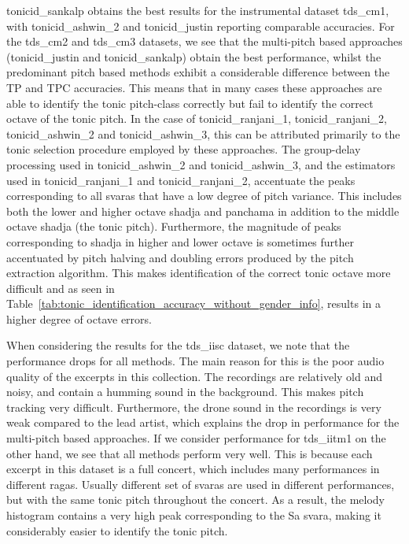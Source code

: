 {\acrshort{tonicid_sankalp} obtains the best results for the instrumental dataset \acrshort{tds_cm1}, with \acrshort{tonicid_ashwin_2} and \acrshort{tonicid_justin} reporting comparable accuracies. For the \acrshort{tds_cm2} and \acrshort{tds_cm3} datasets, we see that the multi-pitch based approaches (\acrshort{tonicid_justin} and \acrshort{tonicid_sankalp}) obtain the best performance, whilst the predominant pitch based methods exhibit a considerable difference between the TP and TPC accuracies. This means that in many cases these approaches are able to identify the tonic pitch-class correctly but fail to identify the correct octave of the tonic pitch. In the case of \acrshort{tonicid_ranjani_1}, \acrshort{tonicid_ranjani_2}, \acrshort{tonicid_ashwin_2} and \acrshort{tonicid_ashwin_3}, this can be attributed primarily to the tonic selection procedure employed by these approaches. The group-delay processing used in \acrshort{tonicid_ashwin_2} and \acrshort{tonicid_ashwin_3}, and the estimators used in \acrshort{tonicid_ranjani_1} and \acrshort{tonicid_ranjani_2}, accentuate the peaks corresponding to all \glspl{svara} that have a low degree of pitch variance. This includes both the lower and higher octave \gls{shadja} and panchama in addition to the middle octave \gls{shadja} (the tonic pitch). Furthermore, the magnitude of peaks corresponding to \gls{shadja} in higher and lower octave is sometimes further accentuated by pitch halving and doubling errors produced by the pitch extraction algorithm. This makes identification of the correct tonic octave more difficult and as seen in Table~\ref{tab:tonic_identification_accuracy_without_gender_info}, results in a higher degree of octave errors.

When considering the results for the \acrshort{tds_iisc} dataset, we note that the performance drops for all methods. The main reason for this is the poor audio quality of the excerpts in this collection. The recordings are relatively old and noisy, and contain a humming sound in the background. This makes pitch
tracking very difficult. Furthermore, the drone sound in the recordings is very weak compared to the lead artist, which explains the drop in performance for the multi-pitch based approaches. If we consider performance for \acrshort{tds_iitm1} on the other hand, we see that all methods perform very well. This is because each excerpt in this dataset is a full concert, which includes many performances in different \glspl{raga}. Usually different set of \glspl{svara} are used in different performances, but with the same tonic pitch throughout the concert. As a result, the melody histogram contains a very high peak corresponding to the Sa \gls{svara}, making it considerably easier to identify the tonic pitch.

}

